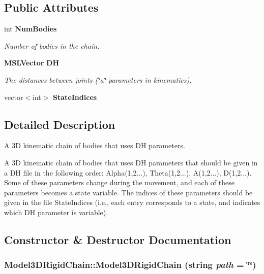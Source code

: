 \subsection*{Public Attributes}
\begin{CompactItemize}
\item 
int {\bf Num\-Bodies}
\begin{CompactList}\small\item\em Number of bodies in the chain.\item\end{CompactList}\item 
{\bf MSLVector} {\bf DH}
\begin{CompactList}\small\item\em The distances between joints (\char`\"{}a\char`\"{} parameters in kinematics).\item\end{CompactList}\item 
vector$<$int$>$ {\bf State\-Indices}
\end{CompactItemize}


\subsection{Detailed Description}
A 3D kinematic chain of bodies that uses DH parameters.

A 3D kinematic chain of bodies that uses DH parameters that should be given in a DH file in the following order: Alpha(1,2...), Theta(1,2...), A(1,2...), D(1,2...). Some of these parameters change during the movement, and each of these parameters becomes a state variable. The indices of these parameters should be given in the file State\-Indices (i.e., each entry corresponds to a state, and indicates which DH parameter is variable). 



\subsection{Constructor \& Destructor Documentation}
\subsubsection{\setlength{\rightskip}{0pt plus 5cm}Model3DRigid\-Chain::Model3DRigid\-Chain (string {\em path} = \char`\"{}\char`\"{})}\label{classModel3DRigidChain_a0}


